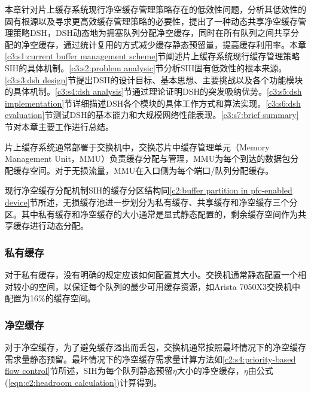 


本章针对片上缓存系统现行净空缓存管理策略存在的低效性问题，分析其低效性的固有根源以及寻求更高效缓存管理策略的必要性，提出了一种动态共享净空缓存管理策略DSH，DSH动态地为拥塞队列分配净空缓存，同时在所有队列之间共享分配的净空缓存，通过统计复用的方式减少缓存静态预留量，提高缓存利用率。本章\ref{c3:s1:current buffer management scheme}节阐述片上缓存系统现行缓存管理策略SIH的具体机制。\ref{c3:s2:problem analysic}节分析SIH固有低效性的根本来源。\ref{c3:s3:dsh design}节提出DSH的设计目标、基本思想、主要挑战以及各个功能模块的具体机制。\ref{c3:s4:dsh analysis}节通过理论证明DSH的突发吸纳优势。\ref{c3:s5:dsh implementation}节详细描述DSH各个模块的具体工作方式和算法实现。\ref{c3:s6:dsh evaluation}节测试DSH的基本能力和大规模网络性能表现。\ref{c3:s7:brief summary}节对本章主要工作进行总结。

\label{c3:s1:current buffer management scheme}

片上缓存系统通常部署于交换机中，交换芯片中缓存管理单元（Memory Management Unit，MMU）负责缓存分配与管理，MMU为每个到达的数据包分配缓存空间。对于无损流量，MMU在入口侧为每个端口/队列分配缓存\cite{BCM88800TM,MellanoxRoCEConfig,CiscoNexus9300}。

现行净空缓存分配机制SIH的缓存分区结构同\ref{c2:buffer partition in pfc-enabled device}节所述，无损缓存池进一步划分为私有缓存、共享缓存和净空缓存三个分区。其中私有缓存和净空缓存的大小通常是显式静态配置的，剩余缓存空间作为共享缓存进行动态分配。

\subsubsection{私有缓存}

对于私有缓存，没有明确的规定应该如何配置其大小。交换机通常静态配置一个相对较小的空间\cite{SIGCOMM15DCQCN,SIGCOMM16RDMA}，以保证每个队列的最少可用缓存资源，如Arista 7050X3交换机中配置为16\%的缓存空间\cite{Arista7050X3}。

\subsubsection{净空缓存}

对于净空缓存，为了避免缓存溢出而丢包，交换机通常按照最坏情况下的净空缓存需求量静态预留。最坏情况下的净空缓存需求量计算方法如\ref{c2:s4:priority-based flow control}节所述，SIH为每个队列静态预留$\eta$大小的净空缓存，$\eta$由公式(\ref{eqn:c2:headroom calculation})计算得到。

